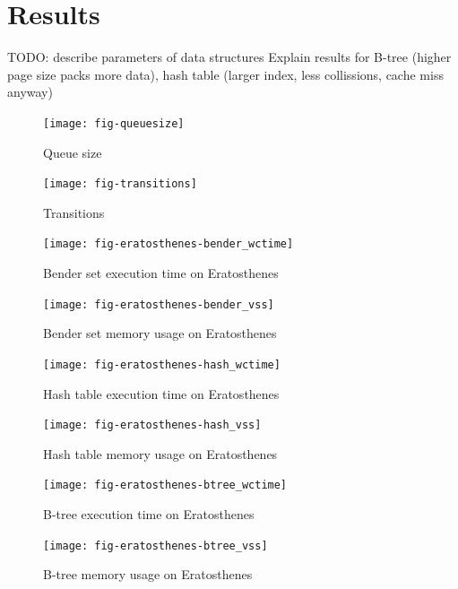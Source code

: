 \documentclass{acm_proc_article-sp}
\begin{document}

\section{Results}

TODO: describe parameters of data structures
Explain results for B-tree (higher page size packs more data), hash table (larger index, less collissions, cache miss anyway)

\begin{figure}
\centering
\texttt{[image: fig-queuesize]}
\caption{Queue size}
\label{fig-quesize}
\end{figure}

\begin{figure}
\centering
\texttt{[image: fig-transitions]}
\caption{Transitions}
\label{fig-transitions}
\end{figure}

\begin{figure}
\centering
\texttt{[image: fig-eratosthenes-bender\_wctime]}
\caption{Bender set execution time on Eratosthenes}
\label{fig-eratosthenes-bender_wctime}
\end{figure}

\begin{figure}
\centering
\texttt{[image: fig-eratosthenes-bender\_vss]}
\caption{Bender set memory usage on Eratosthenes}
\label{fig-eratosthenes-bender_vss}
\end{figure}

\begin{figure}
\centering
\texttt{[image: fig-eratosthenes-hash\_wctime]}
\caption{Hash table execution time on Eratosthenes}
\label{fig-eratosthenes-hash_wctime}
\end{figure}

\begin{figure}
\centering
\texttt{[image: fig-eratosthenes-hash\_vss]}
\caption{Hash table memory usage on Eratosthenes}
\label{fig-eratosthenes-hash_vss}
\end{figure}

\begin{figure}
\centering
\texttt{[image: fig-eratosthenes-btree\_wctime]}
\caption{B-tree execution time on Eratosthenes}
\label{fig-eratosthenes-btree_wctime}
\end{figure}

\begin{figure}
\centering
\texttt{[image: fig-eratosthenes-btree\_vss]}
\caption{B-tree memory usage on Eratosthenes}
\label{fig-eratosthenes-btree_vss}
\end{figure}
\end{document}
